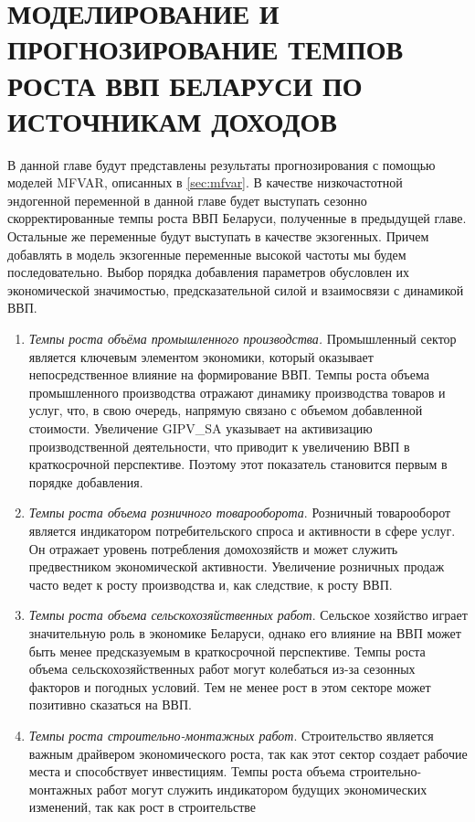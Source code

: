\documentclass[a4paper, 14pt]{extreport}
\numberwithin{equation}{subsection}
\numberwithin{equation}{section}
\begin{document}
	\newpage
	
	\chapter{МОДЕЛИРОВАНИЕ И ПРОГНОЗИРОВАНИЕ ТЕМПОВ РОСТА ВВП БЕЛАРУСИ ПО ИСТОЧНИКАМ ДОХОДОВ}
	В данной главе будут представлены результаты прогнозирования с помощью моделей MFVAR, описанных в \ref{sec:mfvar}. В качестве низкочастотной эндогенной переменной в данной главе будет выступать сезонно скорректированные темпы роста ВВП Беларуси, полученные в предыдущей главе. Остальные же переменные будут выступать в качестве экзогенных. Причем добавлять в модель экзогенные переменные высокой частоты мы будем последовательно. Выбор порядка добавления параметров обусловлен их экономической значимостью, предсказательной силой и взаимосвязи с динамикой ВВП.
	\begin{enumerate}
		\item \textit{Темпы роста объёма промышленного производства.}
		Промышленный сектор является ключевым элементом экономики, который оказывает непосредственное влияние на формирование ВВП. Темпы
		роста объема промышленного производства отражают динамику производства товаров и услуг, что, в свою очередь, напрямую связано с объемом добавленной стоимости. Увеличение GIPV\_SA указывает на активизацию производственной деятельности, что приводит к увеличению
		ВВП в краткосрочной перспективе. Поэтому этот показатель становится
		первым в порядке добавления.
		\item \textit{Темпы роста объема розничного товарооборота}.
		Розничный товарооборот является индикатором потребительского спроса и активности в сфере услуг. Он отражает уровень потребления домохозяйств и может служить предвестником экономической активности.
		Увеличение розничных продаж часто ведет к росту производства и, как
		следствие, к росту ВВП.
		\item \textit{Темпы роста объема сельскохозяйственных работ}.
		Сельское хозяйство играет значительную роль в экономике Беларуси, однако его влияние на ВВП может быть менее предсказуемым в краткосрочной перспективе. Темпы роста объема сельскохозяйственных работ могут
		колебаться из-за сезонных факторов и погодных условий. Тем не менее рост в этом секторе может позитивно сказаться на ВВП.
		\item \textit{Темпы роста строительно-монтажных работ}.
		Строительство является важным драйвером экономического роста, так
		как этот сектор создает рабочие места и способствует инвестициям. Темпы роста объема строительно-монтажных работ могут служить индикатором будущих экономических изменений, так как рост в строительстве

\end{enumerate}
\end{document}

